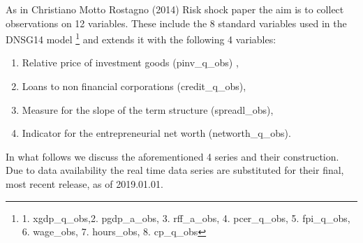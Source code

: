 \documentclass[3p,review,times]{elsarticle}		%
\begin{document}
As in Christiano Motto Rostagno (2014) Risk shock paper the aim is to collect observations on 12 variables. These include the 8 standard variables used in the DNSG14 model \footnote{1. xgdp\_q\_obs,2. pgdp\_a\_obs, 3. rff\_a\_obs, 4. pcer\_q\_obs, 5. fpi\_q\_obs, 6. wage\_obs, 7. hours\_obs, 8.     cp\_q\_obs} and extends it with the following 4 variables:
\begin{enumerate}
	\item Relative price of investment goods (pinv\_q\_obs) ,
	\item Loans to non financial corporations (credit\_q\_obs),
	\item Measure for the slope of the term structure (spreadl\_obs),
	\item Indicator for the entrepreneurial net worth (networth\_q\_obs).
\end{enumerate}
In what follows we discuss the aforementioned 4 series and their construction. Due to data availability the real time data series are substituted for their final, most recent release, as of 2019.01.01.
\end{document}
